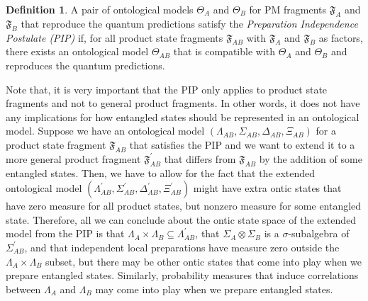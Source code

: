 \documentclass[DIV=calc,paper=a4,fontsize=11pt,twocolumn]{scrartcl} %
\theoremstyle{definition}
\newtheorem{definition}{Definition}[section]
\theoremstyle{plain}
\begin{document}
\begin{definition}
A pair of ontological models $\Theta_A$ and $\Theta_B$ for PM
fragments $\mathfrak{F}_A$ and $\mathfrak{F}_B$ that reproduce the
quantum predictions satisfy the \emph{Preparation Independence
Postulate (PIP)} if, for all product state fragments
$\mathfrak{F}_{AB}$ with $\mathfrak{F}_A$ and $\mathfrak{F}_B$ as
factors, there exists an ontological model $\Theta_{AB}$ that is
compatible with $\Theta_A$ and $\Theta_B$ and reproduces the quantum
predictions.
\end{definition}

Note that, it is very important that the PIP only applies to product
state fragments and not to general product fragments.  In other words,
it does not have any implications for how entangled states should be
represented in an ontological model.  Suppose we have an ontological
model $(\Lambda_{AB}, \Sigma_{AB}, \Delta_{AB}, \Xi_{AB})$ for a
product state fragment $\mathfrak{F}_{AB}$ that satisfies the PIP and
we want to extend it to a more general product fragment
$\mathfrak{F}^{\prime}_{AB}$ that differs from $\mathfrak{F}_{AB}$ by
the addition of some entangled states.  Then, we have to allow for the
fact that the extended ontological model $(\Lambda^{\prime}_{AB},
\Sigma^{\prime}_{AB}, \Delta^{\prime}_{AB}, \Xi^{\prime}_{AB})$ might
have extra ontic states that have zero measure for all product states,
but nonzero measure for some entangled state.  Therefore, all we can
conclude about the ontic state space of the extended model from the
PIP is that $\Lambda_A \times \Lambda_B \subseteq
\Lambda^{\prime}_{AB}$, that $\Sigma_A \otimes \Sigma_B$ is a
$\sigma$-subalgebra of $\Sigma^{\prime}_{AB}$, and that independent
local preparations have measure zero outside the $\Lambda_A \times
\Lambda_B$ subset, but there may be other ontic states that come into
play when we prepare entangled states.  Similarly, probability
measures that induce correlations between $\Lambda_A$ and $\Lambda_B$
may come into play when we prepare entangled states.
\end{document}
